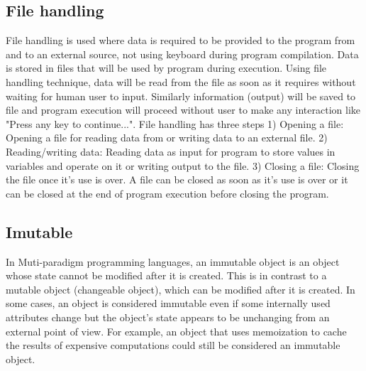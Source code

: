 \documentclass{sig-alternate}
\begin{document}
\subsection{File handling}
File handling is used where data is required to be provided to the program from and to an external source, not using keyboard during program compilation. Data is stored in files that will be used by program during execution. Using file handling technique, data will be read from the file as soon as it requires without waiting for human user to input. Similarly information (output) will be saved to file and program execution will proceed without user to make any interaction like "Press any key to continue...". File handling has three steps 1) Opening a file: Opening a file for reading data from or writing data to an external file. 2) Reading/writing data: Reading data as input for program to store values in variables and operate on it or writing output to the file. 3) Closing a file: Closing the file once it’s use is over. A file can be closed as soon as it’s use is over or it can be closed at the end of program execution before closing the program.
\subsection{Imutable}
In Muti-paradigm programming languages, an immutable object is an object whose state cannot be modified after it is created. This is in contrast to a mutable object (changeable object), which can be modified after it is created. In some cases, an object is considered immutable even if some internally used attributes change but the object's state appears to be unchanging from an external point of view. For example, an object that uses memoization to cache the results of expensive computations could still be considered an immutable object.
\end{document}
